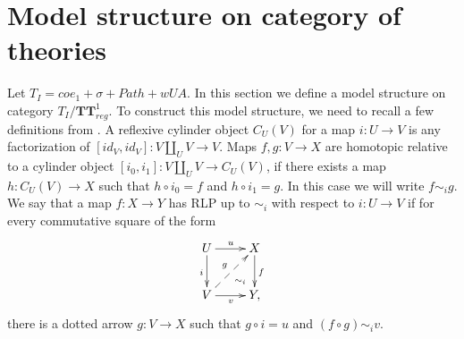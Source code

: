 \documentclass[reqno]{amsart}
\theoremstyle{definition}
\theoremstyle{remark}
\newcommand{\cat}[1]{\mathbf{#1}}
\newcommand{\Mod}[1]{#1\text{-}\cat{Mod}}
\newcommand{\algtt}{\cat{TT}}
\newcommand{\cyli}{i}
\numberwithin{figure}{section}
\begin{document}
\begin{comment}
For every morphism $h : M \to N$ of models of $\mathbb{T}$, we can define a morphism $Lang^0_{con}(h) : Lang^0_{con}(M) \to Lang^0_{con}(N)$ of theories under $\mathbb{T}$ as $Lang(h)(O_a(\Gamma)) = O_{h(a)}(\Gamma)$.
Thus $Lang^0_{con}$ is a functor $\Mod{\mathbb{T}} \to \mathbb{T}/\algtt^0_{con}$.

\begin{prop}
$Lang^0_{con}$ is left adjoint to $Syn^0_{con}$.
\end{prop}
\begin{proof}
To prove this, it is enough to show that the composition of $Lang^0_{con}$ and the inclusion $\mathbb{T}/\algtt^0_{con} \to \mathbb{T}/\algtt^0$ is isomorphic to $Lang^0$.
Let $\alpha_M : Lang^0(M) \to Lang^0_{con}(M)$ be defined as $\alpha_M(O_a) = C_a$.
Let $\beta_M : Lang^0_{con}(M) \to Lang^0(M)$ be defined as $\beta_M(O_a(\Gamma)) = O_a|_{\Gamma = C_{M(ctx_{p,n})(a)}}$.
To prove that $\alpha$ and $\beta$ are inverses of each other, we need to show that $\sststile{}{\Gamma} O_a(\Gamma) \cong C_a|_{\Gamma = C_{M(ctx_{p,n})(a)}}$ is a theorem of $Lang^0_{con}(M)$.
But this follows from the first axiom of $Lang^0_{con}(M)$.
\end{proof}

For every algebraic dependent type theory with substitutions $\mathbb{T}$, there are adjoint functors $Lang^1 \dashv Syn^1 : \mathbb{T}/\algtt^1 \to \Mod{\mathbb{T}}$.
For every contextual algebraic dependent type theory with substitutions $\mathbb{T}$, there are adjoint functors $Lang^1_{con} \dashv Syn^1_{con} : \mathbb{T}/\algtt^1_{con} \to \Mod{\mathbb{T}}$.
These functors are defined in the same way as $Lang^0 \dashv Syn^0$ and $Lang^0_{con} \dashv Syn^0_{con}$.
\end{comment}

\section{Model structure on category of theories}

Let $T_I = coe_1 + \sigma + Path + wUA$.
In this section we define a model structure on category $T_I/\algtt^1_{reg}$.
To construct this model structure, we need to recall a few definitions from \cite{f-model-structures}.
A reflexive cylinder object $C_U(V)$ for a map $i : U \to V$ is any factorization of $[id_V,id_V] : V \amalg_U V \to V$.
Maps $f,g : V \to X$ are homotopic relative to a cylinder object $[\cyli_0,\cyli_1] : V \amalg_U V \to C_U(V)$, if there exists a map $h : C_U(V) \to X$
such that $h \circ \cyli_0 = f$ and $h \circ \cyli_1 = g$.
In this case we will write $f \sim_i g$.
We say that a map $f : X \to Y$ has RLP up to $\sim_i$ with respect to $i : U \to V$ if for every commutative square of the form
\[ \xymatrix{ U \ar[r]^u \ar@{}[dr]|(.7){\sim_i} \ar[d]_i & X \ar[d]^f \\
              V \ar[r]_v \ar@{-->}[ur]^g                  & Y,
            } \]
there is a dotted arrow $g : V \to X$ such that $g \circ i = u$ and $(f \circ g) \sim_i v$.
\end{document}
